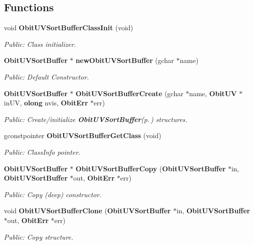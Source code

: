 \subsection*{Functions}
\begin{CompactItemize}
\item 
void {\bf Obit\-UVSort\-Buffer\-Class\-Init} (void)
\begin{CompactList}\small\item\em Public: Class initializer. \item\end{CompactList}\item 
{\bf Obit\-UVSort\-Buffer} $\ast$ {\bf new\-Obit\-UVSort\-Buffer} (gchar $\ast$name)
\begin{CompactList}\small\item\em Public: Default Constructor. \item\end{CompactList}\item 
{\bf Obit\-UVSort\-Buffer} $\ast$ {\bf Obit\-UVSort\-Buffer\-Create} (gchar $\ast$name, {\bf Obit\-UV} $\ast$in\-UV, {\bf olong} nvis, {\bf Obit\-Err} $\ast$err)
\begin{CompactList}\small\item\em Public: Create/initialize {\bf Obit\-UVSort\-Buffer}{\rm (p.\,\pageref{structObitUVSortBuffer})} structures. \item\end{CompactList}\item 
gconstpointer {\bf Obit\-UVSort\-Buffer\-Get\-Class} (void)
\begin{CompactList}\small\item\em Public: Class\-Info pointer. \item\end{CompactList}\item 
{\bf Obit\-UVSort\-Buffer} $\ast$ {\bf Obit\-UVSort\-Buffer\-Copy} ({\bf Obit\-UVSort\-Buffer} $\ast$in, {\bf Obit\-UVSort\-Buffer} $\ast$out, {\bf Obit\-Err} $\ast$err)
\begin{CompactList}\small\item\em Public: Copy (deep) constructor. \item\end{CompactList}\item 
void {\bf Obit\-UVSort\-Buffer\-Clone} ({\bf Obit\-UVSort\-Buffer} $\ast$in, {\bf Obit\-UVSort\-Buffer} $\ast$out, {\bf Obit\-Err} $\ast$err)
\begin{CompactList}\small\item\em Public: Copy structure. \item\end{CompactList}\item 

\end{CompactItemize}
